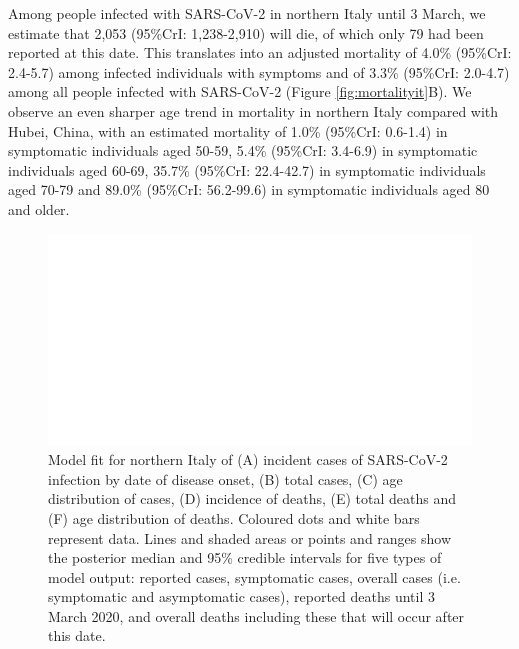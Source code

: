 \documentclass{article}
\begin{document}
Among people infected with SARS-CoV-2 in northern Italy until 3 March, we estimate that 2,053 (95\%CrI: 1,238-2,910) will die, of which only 79 had been reported at this date.
This translates into an adjusted mortality of 4.0\% (95\%CrI: 2.4-5.7) among infected individuals with symptoms and of 3.3\% (95\%CrI: 2.0-4.7) among all people infected with SARS-CoV-2 (Figure \ref{fig:mortalityit}B).
We observe an even sharper age trend in mortality in northern Italy compared with Hubei, China, with an estimated mortality of 1.0\% (95\%CrI: 0.6-1.4) in symptomatic individuals aged 50-59, 5.4\% (95\%CrI: 3.4-6.9) in symptomatic individuals aged 60-69, 35.7\% (95\%CrI: 22.4-42.7) in symptomatic individuals aged 70-79 and 89.0\% (95\%CrI: 56.2-99.6) in symptomatic individuals aged 80 and older. 

\begin{figure}[h]
	\includegraphics[width=\linewidth]{../format_output/figures/modelfit_italy.pdf}
	\caption{Model fit for northern Italy of (A) incident cases of SARS-CoV-2 infection by date of disease onset, (B) total cases, (C) age distribution of cases, (D) incidence of deaths, (E) total deaths and (F) age distribution of deaths. Coloured dots and white bars represent data. Lines and shaded areas or points and ranges show the posterior median and 95\% credible intervals for five types of model output: reported cases, symptomatic cases, overall cases (i.e. symptomatic and asymptomatic cases), reported deaths until 3 March 2020, and overall deaths including these that will occur after this date.}
	\label{fig:fitit}
\end{figure}
\end{document}
